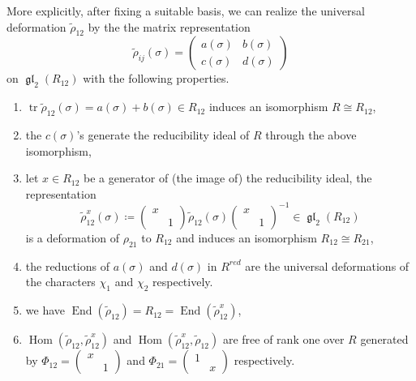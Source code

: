 \documentclass[leqno]{amsart}
\newcommand{\smat}[1]{\left( \begin{smallmatrix} #1 \end{smallmatrix} \right)}
\newcommand{\mat}[1]{\left( \begin{smallmatrix} #1 \end{smallmatrix} \right)}
\DeclareMathOperator{\gl}{\mathfrak{gl}}
\DeclareMathOperator{\mtr}{tr}
\newcommand{\1}{\mathbf{1}}
\DeclareMathOperator{\End}{End}
\DeclareMathOperator{\Hom}{Hom}
\theoremstyle{definition}
\theoremstyle{remark}
\begin{document}
More explicitly, after fixing a suitable basis, we can realize the universal deformation 
$\tilde{\rho}_{12}$ by the the matrix representation
\begin{equation*}
    \tilde{\rho}_{ij}(\sigma)=\mat{a(\sigma) & b(\sigma)\\ c(\sigma) & d(\sigma)}
\end{equation*}
on $\gl_2(R_{12})$ with the following properties.
\begin{enumerate}[label=(\roman*)]
    \item $\mtr\tilde{\rho}_{12}(\sigma)=a(\sigma)+b(\sigma)\in R_{12}$ induces an isomorphism $R\cong R_{12}$,
    \item the $c(\sigma)$'s generate the reducibility ideal of $R$ through the above isomorphism,
    \item let $x\in R_{12}$ be a generator of (the image of) the reducibility ideal, 
    the representation
    \begin{equation*}
        \tilde{\rho}_{12}^x(\sigma)\coloneqq \mat{x&\\&1}\tilde{\rho}_{12}(\sigma)\mat{x&\\&1}^{-1}\in \gl_2(R_{12})
    \end{equation*}
    is a deformation of $\rho_{21}$ to $R_{12}$ and induces an isomorphism $R_{12}\cong R_{21}$,
    \item the reductions of $a(\sigma)$ and $d(\sigma)$ in $R^{red}$ are
    the universal deformations of the characters $\chi_1$ and $\chi_2$ respectively.
    \item we have $\End(\tilde{\rho}_{12})=R_{12}=\End(\tilde{\rho}^x_{12})$,
    \item $\Hom(\tilde{\rho}_{12},\tilde{\rho}_{12}^x)$
    and $\Hom(\tilde{\rho}_{12}^x,\tilde{\rho}_{12})$
    are free of rank one over $R$ generated by 
    $\Phi_{12}=\smat{x&\\&1}$ and $\Phi_{21}=\smat{1&\\&x}$ respectively.
\end{enumerate}







\end{document}
